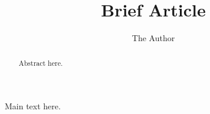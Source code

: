 \documentclass[11pt, oneside]{article}   	%
\title{Brief Article}
\author{The Author}
\date{}
\begin{document}
\maketitle


\begin{abstract}
  Abstract here.
\end{abstract}

Main text here.
\end{document}
